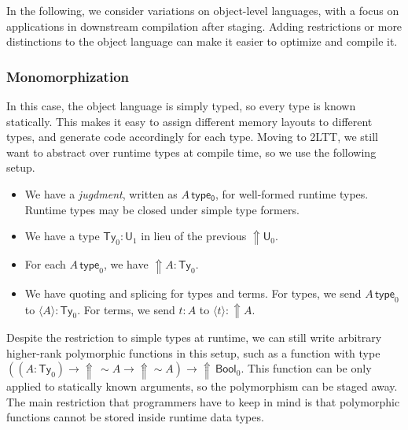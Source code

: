 \documentclass[acmsmall]{acmart}
\newcommand{\msf}[1]{\mathsf{#1}}
\newcommand{\Lift}{{\Uparrow}}
\newcommand{\spl}{{\sim}}
\newcommand{\qut}[1]{\langle #1\rangle}
\renewcommand{\U}{\msf{U}}
\newcommand{\Ty}{\msf{Ty}}
\newcommand{\Bool}{\msf{Bool}}
\theoremstyle{remark}
\begin{document}


In the following, we consider variations on object-level languages, with a focus
on applications in downstream compilation after staging. Adding restrictions or
more distinctions to the object language can make it easier to optimize and
compile it.



\subsubsection{Monomorphization}\label{sec:monomorphization}

In this case, the object language is simply typed, so every type is known
statically. This makes it easy to assign different memory layouts to different
types, and generate code accordingly for each type. Moving to 2LTT, we still
want to abstract over runtime types at compile time, so we use the following
setup.
\begin{itemize}
\item We have a \emph{jugdment}, written as $A\,\msf{type_0}$, for well-formed
  runtime types. Runtime types may be closed under simple type formers.
\item We have a type $\Ty_0 : \U_1$ in lieu of the previous $\Lift \U_0$.
\item For each $A\,\msf{type}_0$, we have $\Lift A : \Ty_0$.
\item We have quoting and splicing for types and terms. For types, we send $A\,
  \msf{type}_0$ to $\qut{A} : \Ty_0$. For terms, we send $t : A$ to $\qut{t} :
  \Lift A$.
\end{itemize}
Despite the restriction to simple types at runtime, we can still write arbitrary
higher-rank polymorphic functions in this setup, such as a function with type
$((A : \Ty_0) \to \Lift\,\spl A \to \Lift \spl A) \to \Lift\,\Bool_0$. This
function can be only applied to statically known arguments, so the polymorphism
can be staged away. The main restriction that programmers have to keep in mind
is that polymorphic functions cannot be stored inside runtime data types.
\end{document}
